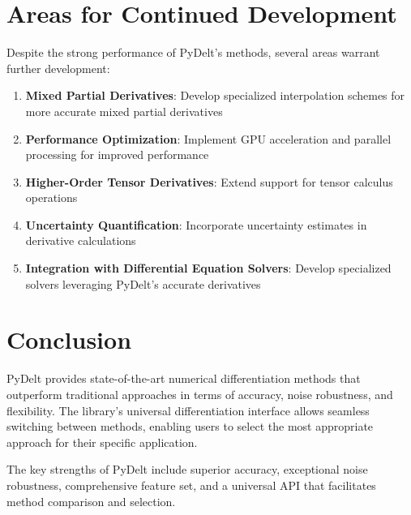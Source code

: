 \documentclass[10pt,journal,compsoc]{IEEEtran}
\begin{document}
\section{Areas for Continued Development}

Despite the strong performance of PyDelt's methods, several areas warrant further development:

\begin{enumerate}
    \item \textbf{Mixed Partial Derivatives}: Develop specialized interpolation schemes for more accurate mixed partial derivatives
    \item \textbf{Performance Optimization}: Implement GPU acceleration and parallel processing for improved performance
    \item \textbf{Higher-Order Tensor Derivatives}: Extend support for tensor calculus operations
    \item \textbf{Uncertainty Quantification}: Incorporate uncertainty estimates in derivative calculations
    \item \textbf{Integration with Differential Equation Solvers}: Develop specialized solvers leveraging PyDelt's accurate derivatives
\end{enumerate}

\section{Conclusion}

PyDelt provides state-of-the-art numerical differentiation methods that outperform traditional approaches in terms of accuracy, noise robustness, and flexibility. The library's universal differentiation interface allows seamless switching between methods, enabling users to select the most appropriate approach for their specific application.

The key strengths of PyDelt include superior accuracy, exceptional noise robustness, comprehensive feature set, and a universal API that facilitates method comparison and selection.
\end{document}
